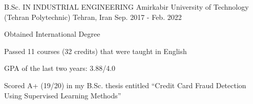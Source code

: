 

\begin{cventries}

  \cventry
    {B.Sc. IN INDUSTRIAL ENGINEERING} %
    {Amirkabir University of Technology (Tehran Polytechnic)} %
    {Tehran, Iran} %
    {Sep. 2017 - Feb. 2022} %
    {
      \begin{cvitems} %
        \item {Obtained International Degree}
        \item {Passed 11 courses (32 credits) that were taught in English}
        \item {GPA of the last two years: 3.88/4.0}
        \item {Scored A+ (19/20) in my B.Sc. thesis entitled ``Credit Card Fraud Detection Using Supervised Learning Methods''}
      \end{cvitems}
    }

\end{cventries}
